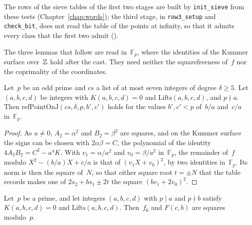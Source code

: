 The rows of the sieve tables of the first two stages are built by \texttt{init\_sieve} from these
tests (Chapter~\ref{chap:words}); the third stage, in \texttt{row3\_setup} and \texttt{check\_bit},
does not read the table of the points at infinity, so that it admits every class that the first two
admit ().


The three lemmas that follow are read in~$\mathbb{F}_p$, where the identities of the Kummer surface
over~$\mathbb{Z}$ hold after the cast. They need neither the squarefreeness of~$f$ nor the coprimality of
the coordinates.

\begin{lemma}\label{lem:refPointOnJ_of_lifts}
  \leanok
  Let~$p$ be an odd prime and $\mathit{cs}$ a list of at most seven integers of degree
  $\delta \ge 5$. Let $(a, b, c, d)$ be integers with $K(a, b, c, d) = 0$ and
  $\mathrm{Lifts}(a, b, c, d)$, and $p \nmid a$. Then
  $\mathrm{refPointOnJ}(\mathit{cs}, \delta, p, b', c')$ holds for the values $b', c' < p$ of~$b/a$
  and~$c/a$ in~$\mathbb{F}_p$.
\end{lemma}

\begin{proof}
  \leanok
  As $a \ne 0$, $A_2 = \alpha^2$ and $B_2 = \beta^2$ are squares, and on the Kummer surface the
  signs can be chosen with $2 \alpha \beta = C$, the polynomial of the identity
  $4 A_2 B_2 = C^2 - a^4 K$. With $v_1 = \alpha / a^2$ and $v_0 = \beta / a^2$ in~$\mathbb{F}_p$,
  the remainder of~$f$ modulo $X^2 - (b/a) X + c/a$ is that of $(v_1 X + v_0)^2$, by two identities
  in~$\mathbb{F}_p$. Its norm is then the square of~$N$, so that either square root $t = \pm N$ that
  the table records makes one of $2 s_2 + b s_1 \pm 2 t$ the square $(b v_1 + 2 v_0)^2$.
\end{proof}

\begin{lemma}\label{lem:isSquare_and_isSquare_sexticForm_of_lifts}
  \leanok
  Let~$p$ be a prime, and let integers $(a, b, c, d)$ with $p \mid a$ and $p \nmid b$ satisfy
  $K(a, b, c, d) = 0$ and $\mathrm{Lifts}(a, b, c, d)$. Then~$f_6$ and $F(c, b)$ are squares
  modulo~$p$.
\end{lemma}


